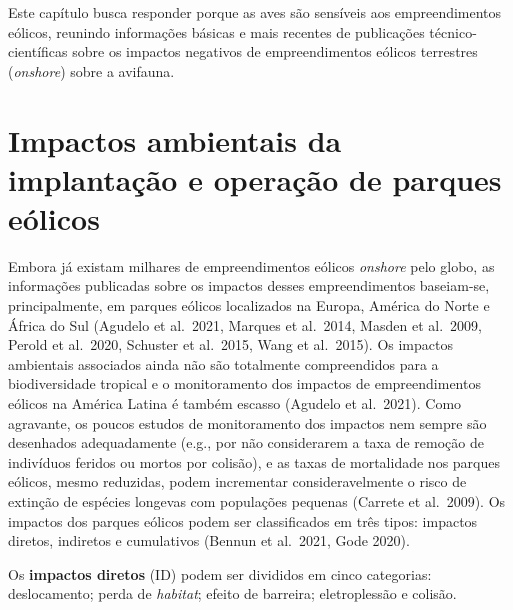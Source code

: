 \documentclass[
  oneside]{scrbook}
\begin{document}
Este capítulo busca responder porque as aves são sensíveis aos empreendimentos eólicos, reunindo informações básicas e mais recentes de publicações técnico-científicas sobre os impactos negativos de empreendimentos eólicos terrestres (\emph{onshore}) sobre a avifauna.

\hypertarget{impactos-ambientais-da-implantauxe7uxe3o-e-operauxe7uxe3o-de-parques-euxf3licos}{%
\section{Impactos ambientais da implantação e operação de parques eólicos}\label{impactos-ambientais-da-implantauxe7uxe3o-e-operauxe7uxe3o-de-parques-euxf3licos}}

Embora já existam milhares de empreendimentos eólicos \emph{onshore} pelo globo, as informações publicadas sobre os impactos desses empreendimentos baseiam-se, principalmente, em parques eólicos localizados na Europa, América do Norte e África do Sul (Agudelo et al.~2021, Marques et al.~2014, Masden et al.~2009, Perold et al.~2020, Schuster et al.~2015, Wang et al.~2015). Os impactos ambientais associados ainda não são totalmente compreendidos para a biodiversidade tropical e o monitoramento dos impactos de empreendimentos eólicos na América Latina é também escasso (Agudelo et al.~2021). Como agravante, os poucos estudos de monitoramento dos impactos nem sempre são desenhados adequadamente (e.g., por não considerarem a taxa de remoção de indivíduos feridos ou mortos por colisão), e as taxas de mortalidade nos parques eólicos, mesmo reduzidas, podem incrementar consideravelmente o risco de extinção de espécies longevas com populações pequenas (Carrete et al.~2009). Os impactos dos parques eólicos podem ser classificados em três tipos: impactos diretos, indiretos e cumulativos (Bennun et al.~2021, Gode 2020).

Os \textbf{impactos diretos} (ID) podem ser divididos em cinco categorias: deslocamento; perda de \emph{habitat}; efeito de barreira; eletroplessão e colisão.
\end{document}
